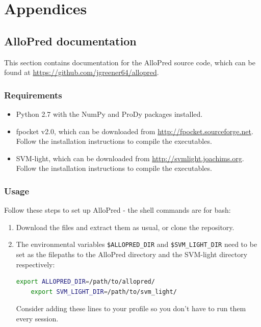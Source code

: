 \chapter{Appendices}
\label{cha:appendices}

\section{AlloPred documentation}

This section contains documentation for the AlloPred source code, which can be found at \url{https://github.com/jgreener64/allopred}.


\subsection{Requirements}

\begin{itemize}
\item Python 2.7 with the NumPy and ProDy packages installed.
\item fpocket v2.0, which can be downloaded from \url{http://fpocket.sourceforge.net}. Follow the installation instructions to compile the executables.
\item SVM-light, which can be downloaded from \url{http://svmlight.joachims.org}. Follow the installation instructions to compile the executables.
\end{itemize}


\subsection{Usage}

Follow these steps to set up AlloPred - the shell commands are for bash:

\begin{enumerate}
\item Download the files and extract them as usual, or clone the repository.
\item The environmental variables \verb|$ALLOPRED_DIR| and \verb|$SVM_LIGHT_DIR| need to be set as the filepaths to the AlloPred directory and the SVM-light directory respectively:
\begin{lstlisting}[language=bash]
    export ALLOPRED_DIR=/path/to/allopred/
    export SVM_LIGHT_DIR=/path/to/svm_light/
\end{lstlisting}
Consider adding these lines to your profile so you don't have to run them every session.
\end{enumerate}

